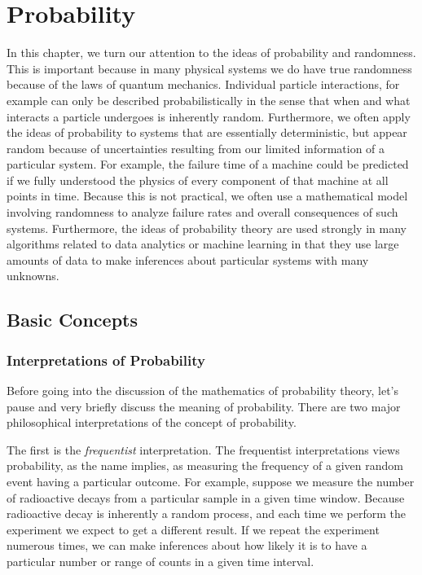 \chapter{Probability} \label{Sec:probability}

In this chapter, we turn our attention to the ideas of probability and randomness. This is important because in many physical systems we do have true randomness because of the laws of quantum mechanics. Individual particle interactions, for example can only be described probabilistically in the sense that when and what interacts a particle undergoes is inherently random. Furthermore, we often apply the ideas of probability to systems that are essentially deterministic, but appear random because of uncertainties resulting from our limited information of a particular system. For example, the failure time of a machine could be predicted if we fully understood the physics of every component of that machine at all points in time. Because this is not practical, we often use a mathematical model involving randomness to analyze failure rates and overall consequences of such systems. Furthermore, the ideas of probability theory are used strongly in many algorithms related to data analytics or machine learning in that they use large amounts of data to make inferences about particular systems with many unknowns.



\section{Basic Concepts}

\subsection{Interpretations of Probability}
Before going into the discussion of the mathematics of probability theory, let's pause and very briefly discuss the meaning of probability. There are two major philosophical interpretations of the concept of probability. 

The first is the \emph{frequentist} interpretation. The frequentist interpretations views probability, as the name implies, as measuring the frequency of a given random event having a particular outcome. For example, suppose we measure the number of radioactive decays from a particular sample in a given time window. Because radioactive decay is inherently a random process, and each time we perform the experiment we expect to get a different result. If we repeat the experiment numerous times, we can make inferences about how likely it is to have a particular number or range of counts in a given time interval. 

